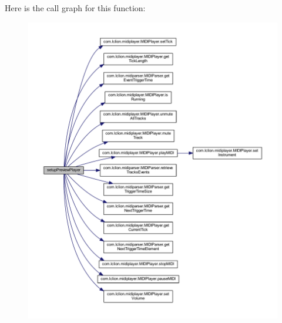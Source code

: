 Here is the call graph for this function\+:\nopagebreak
\begin{figure}[H]
\begin{center}
\leavevmode
\includegraphics[width=350pt]{classcom_1_1lclion_1_1midigui_1_1_dialog_track_import_ab5f5b7d46d664f092c40a045618402b5_cgraph}
\end{center}
\end{figure}




